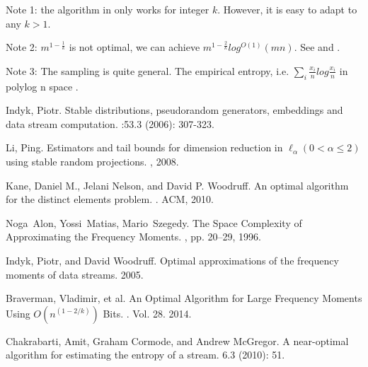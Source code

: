 \documentclass[11pt]{article}
\begin{document}
Note 1: the algorithm in \cite{alon1996space} only works for integer $k$. However, it is easy to adapt to any $k>1$.

Note 2: $m^{1-\frac{1}{k}}$ is not optimal, we can achieve $m^{1-\frac{2}{k}}log^{O(1)}(mn)$. See \cite{indyk2005} and \cite{man2014}.

Note 3: The sampling is quite general. The empirical entropy, i.e. $\sum_i \frac{x_i}{n} log\frac{x_i}{n}$ in polylog n space \cite{cha07}.



\begin{thebibliography}{42}

Indyk, Piotr.
\newblock Stable distributions, pseudorandom generators, embeddings and data stream computation.
:53.3 (2006): 307-323.

Li, Ping.
\newblock Estimators and tail bounds for dimension reduction in $\ell_\alpha (0 < \alpha \le 2)$ using stable random projections.
, 2008.

Kane, Daniel M., Jelani Nelson, and David P. Woodruff. 
\newblock An optimal algorithm for the distinct elements problem. 
. ACM, 2010.

Noga~Alon, Yossi~Matias, Mario~Szegedy.
\newblock The Space Complexity of Approximating the Frequency Moments.
, pp. 20--29, 1996.

Indyk, Piotr, and David Woodruff. 
\newblock Optimal approximations of the frequency moments of data streams. 
 2005.

Braverman, Vladimir, et al. 
\newblock An Optimal Algorithm for Large Frequency Moments Using $O(n^{(1-2/k)})$ Bits. 
. Vol. 28. 2014.

Chakrabarti, Amit, Graham Cormode, and Andrew McGregor. 
\newblock A near-optimal algorithm for estimating the entropy of a stream. 
 6.3 (2010): 51.

\end{thebibliography}
\end{document}
